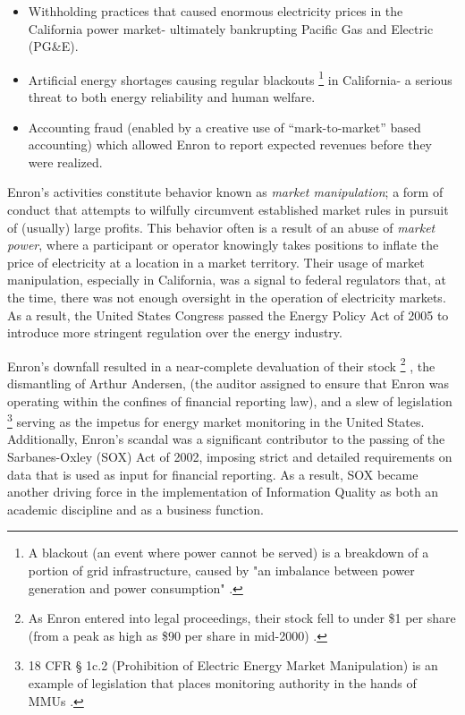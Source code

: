 \begin{itemize}
    \item{Withholding practices that caused enormous electricity prices in the California power market- ultimately bankrupting Pacific Gas and Electric (PG\&E).}
    \item{Artificial energy shortages causing regular blackouts \footnote{A blackout (an event where power cannot be served) is a breakdown of a portion of grid infrastructure, caused by "an imbalance between power generation and power consumption" \cite{nerc1}.}
    in California- a serious threat to both energy reliability and human welfare.}
    \item{Accounting fraud (enabled by a creative use of “mark-to-market” based accounting) which allowed Enron to report expected revenues before they were realized.}
\end{itemize}

Enron’s activities constitute behavior known as \textit{market manipulation}; a form of conduct that attempts to wilfully circumvent established market rules in pursuit of (usually) large profits. This behavior often is a result of an abuse of \textit{market power}, where a participant or operator knowingly takes positions to inflate the price of electricity at a location in a market territory. Their usage of market manipulation, especially in California, was a signal to federal regulators that, at the time, there was not enough oversight in the operation of electricity markets. As a result, the United States Congress passed the Energy Policy Act of 2005 to introduce more stringent regulation over the energy industry.

Enron’s downfall resulted in a near-complete devaluation of their stock \footnote{As Enron entered into legal proceedings, their stock fell to under \$1 per share (from a peak as high as \$90 per share in mid-2000) \cite{enron-stock-chart}. }
, the dismantling of Arthur Andersen, (the auditor assigned to ensure that Enron was operating within the confines of financial reporting law), and a slew of legislation \footnote{18 CFR § 1c.2 (Prohibition of Electric Energy Market Manipulation) is an example of legislation that places monitoring authority in the hands of MMUs \cite{ecfr1}.} 
serving as the impetus for energy market monitoring in the United States. Additionally, Enron’s scandal was a significant contributor to the passing of the Sarbanes-Oxley (SOX) Act of 2002, imposing strict and detailed requirements on data that is used as input for financial reporting. As a result, SOX became another driving force in the implementation of Information Quality as both an academic discipline and as a business function.

